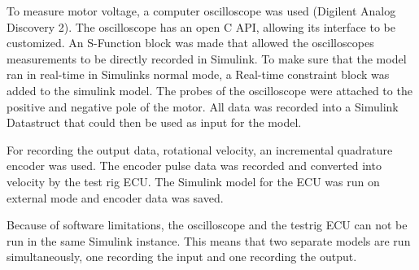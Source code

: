 To measure motor voltage, a computer oscilloscope was used (Digilent Analog
Discovery 2). The oscilloscope has an open C API, allowing its interface to be
customized. An S-Function block was made that allowed the oscilloscopes
measurements to be directly recorded in Simulink. To make sure that the model
ran in real-time in Simulinks normal mode, a Real-time constraint block was
added to the simulink model. The probes of the oscilloscope were attached to
the positive and negative pole of the motor. All data was recorded into a
Simulink Datastruct that could then be used as input for the model. 

For recording the output data, rotational velocity, an incremental quadrature
encoder was used. The encoder pulse data was recorded and converted into
velocity by the test rig ECU. The Simulink model for the ECU was run on external
mode and encoder data was saved. 

Because of software limitations, the oscilloscope and the testrig ECU can not be
run in the same Simulink instance. This means that two separate models are run
simultaneously, one recording the input and one recording the output.

